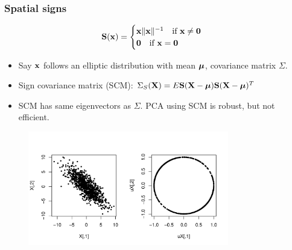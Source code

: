 \documentclass[handout,10pt]{beamer}
\begin{document}
\begin{frame}
\frametitle{Spatial signs \citep{locantore99}}
$$ {\mathbf{S}}({\bf{x}}) = \begin{cases} {\bf{x}}\| {\bf{x}} \|^{-1} \quad \mbox{if }{\bf{x}} \neq \bf0\\
\bf0 \quad \mbox{if }{\bf{x}} = \bf0 \end{cases} $$

\begin{itemize}
\item Say ${\bf{x}}$ follows an elliptic distribution with mean ${\boldsymbol{\mu}}$, covariance matrix $\Sigma$.
\item Sign covariance matrix (SCM): $\Sigma_S({\mathbf{X}}) = E{\mathbf{S}} ({\mathbf{X}} - {\boldsymbol{\mu}}){\mathbf{S}} ({\mathbf{X}} - {\boldsymbol{\mu}})^T$
\item SCM has same eigenvectors as $\Sigma$. PCA using SCM is robust, but not efficient.
\end{itemize}

\begin{figure}\begin{center}
   \includegraphics[height=5cm]{signs.pdf}
   \label{fig:fig2}
\end{center}\end{figure}
\end{frame}
\end{document}
